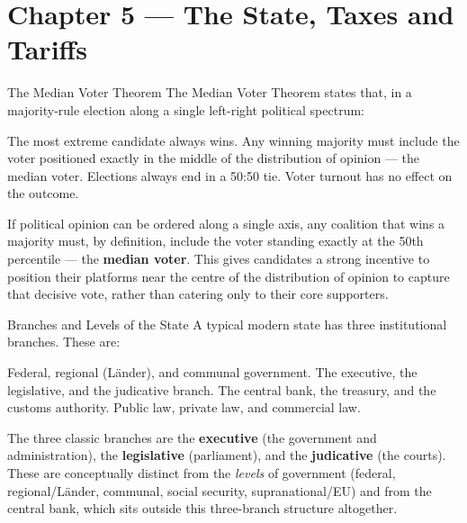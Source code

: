 \section{Chapter 5 — The State, Taxes and Tariffs}

\begin{question}[type=mc]{The Median Voter Theorem}
The Median Voter Theorem states that, in a majority-rule election along a
single left-right political spectrum:
\begin{choices}
  \choice        The most extreme candidate always wins.
  \correctchoice Any winning majority must include the voter positioned
                 exactly in the middle of the distribution of opinion --- the
                 median voter.
  \choice        Elections always end in a 50:50 tie.
  \choice        Voter turnout has no effect on the outcome.
\end{choices}
\begin{solution}
  If political opinion can be ordered along a single axis, any coalition
  that wins a majority must, by definition, include the voter standing
  exactly at the 50th percentile --- the \textbf{median voter}. This gives
  candidates a strong incentive to position their platforms near the centre
  of the distribution of opinion to capture that decisive vote, rather than
  catering only to their core supporters.
\end{solution}
\end{question}

\begin{question}[type=mc]{Branches and Levels of the State}
A typical modern state has three institutional branches. These are:
\begin{choices}
  \choice        Federal, regional (L\"ander), and communal government.
  \correctchoice The executive, the legislative, and the judicative branch.
  \choice        The central bank, the treasury, and the customs authority.
  \choice        Public law, private law, and commercial law.
\end{choices}
\begin{solution}
  The three classic branches are the \textbf{executive} (the government and
  administration), the \textbf{legislative} (parliament), and the
  \textbf{judicative} (the courts). These are conceptually distinct from the
  \emph{levels} of government (federal, regional/Länder, communal, social
  security, supranational/EU) and from the central bank, which sits outside
  this three-branch structure altogether.
\end{solution}
\end{question}


